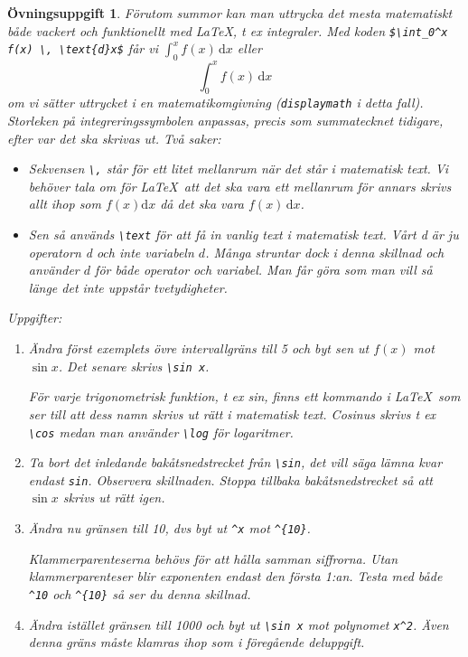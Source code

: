 \documentclass[12pt,a4wide]{article}
\theoremstyle{uppgiftsstil}
\newcommand{\ovningstext}{Övningsuppgift}
\newtheorem{ovning}{\ovningstext}
\newenvironment{uppgift}{\begin{framed}\begin{ovning}}%
                        {\end{ovning}\end{framed}}
\theoremstyle{avklaradstil}
\begin{document}
\begin{uppgift}
  Förutom summor kan man uttrycka det mesta matematiskt både vackert
  och funktionellt med \LaTeX, t ex integraler. Med koden
%  
  \verb|$\int_0^x  f(x) \, \text{d}x$| får vi $\int_0^x  f(x) \,
  \text{d}x$ eller  
%
  \begin{displaymath}
    \int_0^x f(x) \, \text{d}x
  \end{displaymath}
%
  om vi sätter uttrycket i en matematikomgivning (\verb|displaymath| i
  detta fall). Storleken på integreringssymbolen anpassas, precis som
  summatecknet tidigare, efter var det ska skrivas ut. Två saker:
%
  \begin{itemize}
    \item Sekvensen \verb|\,| står för ett litet mellanrum när det
      står i matematisk text. Vi behöver tala om för \LaTeX\ att det
      ska vara ett mellanrum för annars skrivs allt ihop som $f(x)
      \text{d} x$ då det ska vara $f(x) \, \text{d} x$. 
%
    \item Sen så används \verb|\text| för att få in vanlig text i
      matematisk text. Vårt d är ju operatorn d och inte variabeln
      $d$. Många struntar dock i denna skillnad och använder $d$ för
      både operator och variabel. Man får göra som man vill så länge
      det inte uppstår tvetydigheter.
  \end{itemize}
%
  Uppgifter:
%
  \begin{enumerate}
    \item Ändra först exemplets övre intervallgräns till 5 och byt sen
      ut $f(x)$ mot $\sin x$. Det senare skrivs \verb|\sin x|.  

      För varje trigonometrisk funktion, t ex sin, finns ett kommando
      i \LaTeX\ som ser till att dess namn skrivs ut rätt i matematisk
      text. Cosinus skrivs t ex \verb|\cos| medan man använder
      \verb|\log| för logaritmer.  
%
    \item Ta bort det inledande bakåtsnedstrecket från \verb|\sin|,
      det vill säga lämna kvar endast \verb|sin|. Observera
      skillnaden. Stoppa tillbaka bakåtsnedstrecket så att $\sin x$
      skrivs ut rätt igen. 
%
    \item Ändra nu gränsen till 10, dvs byt ut \verb|^x| mot
      \verb|^{10}|. 

      Klammerparenteserna behövs för att hålla samman siffrorna. Utan
      klammerparenteser blir exponenten endast den första 1:an. Testa
      med både \verb|^10| och  \verb|^{10}| så ser du denna skillnad. 
%
    \item Ändra istället gränsen till 1000 och byt ut \verb|\sin x| 
      mot polynomet \verb|x^2|. Även denna gräns måste klamras ihop
      som i föregående deluppgift. 


\end{enumerate}
\end{uppgift}
\end{document}
